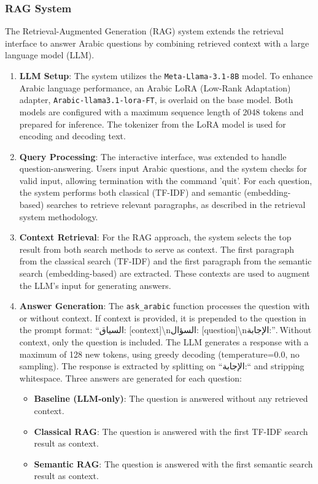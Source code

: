 \documentclass[12pt]{article}
\begin{document}
\subsubsection{RAG System}

The Retrieval-Augmented Generation (RAG) system extends the retrieval interface to answer Arabic questions by combining retrieved context with a large language model (LLM).


\begin{enumerate}
    \item \textbf{LLM Setup}: The system utilizes the \texttt{Meta-Llama-3.1-8B} model. To enhance Arabic language performance, an Arabic LoRA (Low-Rank Adaptation) adapter, \texttt{Arabic-llama3.1-lora-FT}, is overlaid on the base model. Both models are configured with a maximum sequence length of 2048 tokens and prepared for inference. The tokenizer from the LoRA model is used for encoding and decoding text.
    
    \item \textbf{Query Processing}: The interactive interface, was extended to handle question-answering. Users input Arabic questions, and the system checks for valid input, allowing termination with the command 'quit'. For each question, the system performs both classical (TF-IDF) and semantic (embedding-based) searches to retrieve relevant paragraphs, as described in the retrieval system methodology.
    
    \item \textbf{Context Retrieval}: For the RAG approach, the system selects the top result from both search methods to serve as context. The first paragraph from the classical search (TF-IDF) and the first paragraph from the semantic search (embedding-based) are extracted. These contexts are used to augment the LLM’s input for generating answers.
    
    \item \textbf{Answer Generation}: The \texttt{ask\_arabic} function processes the question with or without context. If context is provided, it is prepended to the question in the prompt format: ``السياق: [context]\textbackslash nالسؤال: [question]\textbackslash nالإجابة:''. Without context, only the question is included. The LLM generates a response with a maximum of 128 new tokens, using greedy decoding (temperature=0.0, no sampling). The response is extracted by splitting on ``الإجابة:`` and stripping whitespace. Three answers are generated for each question:
    \begin{itemize}
        \item \textbf{Baseline (LLM-only)}: The question is answered without any retrieved context.
        \item \textbf{Classical RAG}: The question is answered with the first TF-IDF search result as context.
        \item \textbf{Semantic RAG}: The question is answered with the first semantic search result as context.
    \end{itemize}
    

\end{enumerate}
\end{document}

